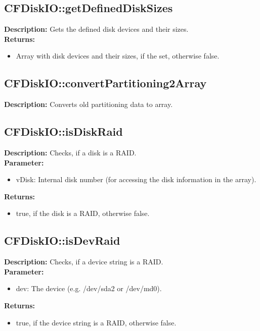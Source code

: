 \subsection{CFDiskIO::getDefinedDiskSizes}
\textbf{Description:} Gets the defined disk devices and their sizes.\\
\textbf{Returns:}
\begin{itemize}
\item Array with disk devices and their sizes, if the set, otherwise false.
\end{itemize}

\subsection{CFDiskIO::convertPartitioning2Array}
\textbf{Description:} Converts old partitioning data to array.\\

\subsection{CFDiskIO::isDiskRaid}
\textbf{Description:} Checks, if a disk is a RAID.\\
\textbf{Parameter:}
\begin{itemize}
\item vDisk: Internal disk number (for accessing the disk information in the array).
\end{itemize}
\textbf{Returns:}
\begin{itemize}
\item true, if the disk is a RAID, otherwise false.
\end{itemize}

\subsection{CFDiskIO::isDevRaid}
\textbf{Description:} Checks, if a device string is a RAID.\\
\textbf{Parameter:}
\begin{itemize}
\item dev: The device (e.g. /dev/sda2 or /dev/md0).
\end{itemize}
\textbf{Returns:}
\begin{itemize}
\item true, if the device string is a RAID, otherwise false.
\end{itemize}

